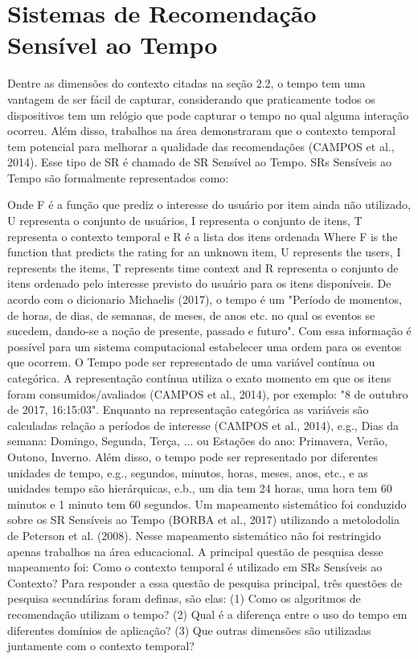 \section{Sistemas de Recomendação Sensível ao Tempo}

Dentre as dimensões do contexto citadas na seção 2.2, o tempo tem uma vantagem de ser fácil de capturar, considerando que praticamente todos os dispositivos tem um relógio que pode capturar o tempo no qual alguma interação ocorreu. Além disso, trabalhos na área demonstraram que o contexto temporal tem potencial para melhorar a qualidade das recomendações (CAMPOS et al., 2014). Esse tipo de SR é chamado de SR Sensível ao Tempo.
SRs Sensíveis ao Tempo são formalmente representados como:

Onde F é a função que prediz o interesse do usuário por item ainda não utilizado, U representa o conjunto de usuários, I representa o conjunto de itens, T representa o contexto temporal e R é a lista dos itens ordenada Where F is the function that predicts the rating for an unknown item, U represents the users, I represents the items, T represents time context and R representa o conjunto de itens ordenado pelo interesse previsto do usuário para os itens disponíveis.
De acordo com o dicionario Michaelis (2017), o tempo é um  "Período de momentos, de horas, de dias, de semanas, de meses, de anos etc. no qual os eventos se sucedem, dando-se a noção de presente, passado e futuro". Com essa informação é possível para um sistema computacional estabelecer uma ordem para os eventos que ocorrem.
O Tempo pode ser representado de uma variável contínua ou categórica. A representação contínua utiliza o exato momento em que os itens foram consumidos/avaliados (CAMPOS et al., 2014), por exemplo: "8 de outubro de 2017, 16:15:03". Enquanto na representação categórica as variáveis são calculadas relação a períodos de interesse (CAMPOS et al., 2014), e.g., Dias da semana: {Domingo, Segunda, Terça, ...} ou Estações do ano: {Primavera, Verão, Outono, Inverno}. Além disso, o tempo pode ser representado por diferentes unidades de tempo, e.g., segundos, minutos, horas, meses, anos, etc., e as unidades tempo são hierárquicas, e.b., um dia tem 24 horas, uma hora tem 60 minutos e 1 minuto tem 60 segundos.
Um mapeamento sistemático foi conduzido sobre os SR Sensíveis ao Tempo (BORBA et al., 2017) utilizando a metolodolia de Peterson et al. (2008). Nesse mapeamento sistemático não foi restringido apenas trabalhos na área educacional. A principal questão de pesquisa desse mapeamento foi: Como o contexto temporal é utilizado em SRs Sensíveis ao Contexto? Para responder a essa questão de pesquisa principal, três questões de pesquisa secundárias foram definas, são elas: (1) Como os algoritmos de recomendação utilizam o tempo? (2) Qual é a diferença entre o uso do tempo em diferentes domínios de aplicação? (3) Que outras dimensões são utilizadas juntamente com o contexto temporal?
